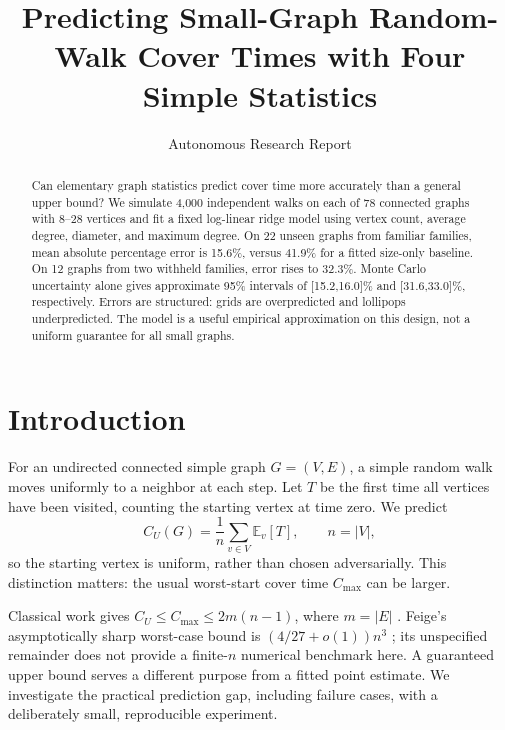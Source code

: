 \documentclass{article}
\title{Predicting Small-Graph Random-Walk Cover Times with Four Simple Statistics}
\author{Autonomous Research Report}
\begin{document}
\maketitle
{}
\begin{abstract}
Can elementary graph statistics predict cover time more accurately than a general upper bound? We simulate 4,000 independent walks on each of 78 connected graphs with 8--28 vertices and fit a fixed log-linear ridge model using vertex count, average degree, diameter, and maximum degree. On 22 unseen graphs from familiar families, mean absolute percentage error is 15.6\%, versus 41.9\% for a fitted size-only baseline. On 12 graphs from two withheld families, error rises to 32.3\%. Monte Carlo uncertainty alone gives approximate 95\% intervals of [15.2,16.0]\% and [31.6,33.0]\%, respectively. Errors are structured: grids are overpredicted and lollipops underpredicted. The model is a useful empirical approximation on this design, not a uniform guarantee for all small graphs.
\end{abstract}

\section{Introduction}
For an undirected connected simple graph $G=(V,E)$, a simple random walk moves uniformly to a neighbor at each step. Let $T$ be the first time all vertices have been visited, counting the starting vertex at time zero. We predict
\[
 C_U(G)=\frac1n\sum_{v\in V}\mathbb E_v[T],\qquad n=|V|,
\]
so the starting vertex is uniform, rather than chosen adversarially. This distinction matters: the usual worst-start cover time $C_{\max}$ can be larger.

Classical work gives $C_U\leq C_{\max}\leq 2m(n-1)$, where $m=|E|$ \citep{aleliunas1979,lovasz1993}. Feige's asymptotically sharp worst-case bound is $(4/27+o(1))n^3$ \citep{feige1995}; its unspecified remainder does not provide a finite-$n$ numerical benchmark here. A guaranteed upper bound serves a different purpose from a fitted point estimate. We investigate the practical prediction gap, including failure cases, with a deliberately small, reproducible experiment.
\end{document}
